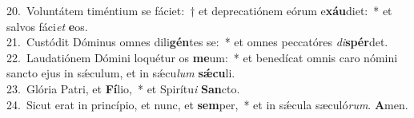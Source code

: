 {20.~}Voluntátem timéntium se fáciet:~† et deprecatiónem eórum e\textbf{xáu}diet:~* et salvos fáci\textit{et} \textbf{e}os.\\
{21.~}Custódit Dóminus omnes dili\textbf{gén}tes se:~* et omnes peccatóres \textit{di}\textbf{spér}det.\\
{22.~}Laudatiónem Dómini loquétur os \textbf{me}um:~* et benedícat omnis caro nómini sancto ejus in sǽculum, et in sǽcu\textit{lum} \textbf{sǽ}\textbf{cu}li.\\
{23.~}Glória Patri, et \textbf{Fí}lio,~* et Spirítu\textit{i} \textbf{San}cto.\\
{24.~}Sicut erat in princípio, et nunc, et \textbf{sem}per,~* et in sǽcula sæculó\textit{rum}. \textbf{A}men.\\
